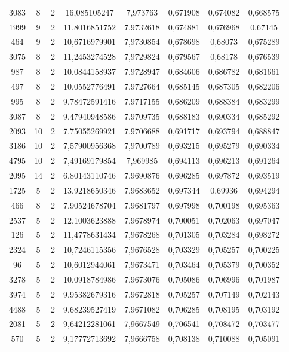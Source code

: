 \begin{longtable}{|c|c|c|c|c|c|c|c|}
3083 & 8 & 2 & 16,085105247 & 7,973763 & 0,671908 & 0,674082 & 0,668575 \\
1999 & 9 & 2 & 11,8016851752 & 7,9732618 & 0,674881 & 0,676968 & 0,67145 \\
464 & 9 & 2 & 10,6716979901 & 7,9730854 & 0,678698 & 0,68073 & 0,675289 \\
3075 & 8 & 2 & 11,2453274528 & 7,9729824 & 0,679567 & 0,68178 & 0,676539 \\
987 & 8 & 2 & 10,0844158937 & 7,9728947 & 0,684606 & 0,686782 & 0,681661 \\
497 & 8 & 2 & 10,0552776491 & 7,9727664 & 0,685145 & 0,687305 & 0,682206 \\
995 & 8 & 2 & 9,78472591416 & 7,9717155 & 0,686209 & 0,688384 & 0,683299 \\
3087 & 8 & 2 & 9,47940948586 & 7,9709735 & 0,688183 & 0,690334 & 0,685292 \\
2093 & 10 & 2 & 7,75055269921 & 7,9706688 & 0,691717 & 0,693794 & 0,688847 \\
3186 & 10 & 2 & 7,57900956368 & 7,9700789 & 0,693215 & 0,695279 & 0,690334 \\
4795 & 10 & 2 & 7,49169179854 & 7,969985 & 0,694113 & 0,696213 & 0,691264 \\
2095 & 14 & 2 & 6,80143110746 & 7,9690876 & 0,696285 & 0,697872 & 0,693519 \\
1725 & 5 & 2 & 13,9218650346 & 7,9683652 & 0,697344 & 0,69936 & 0,694294 \\
466 & 8 & 2 & 7,90524678704 & 7,9681797 & 0,697998 & 0,700198 & 0,695363 \\
2537 & 5 & 2 & 12,1003623888 & 7,9678974 & 0,700051 & 0,702063 & 0,697047 \\
126 & 5 & 2 & 11,4778631434 & 7,9678268 & 0,701305 & 0,703284 & 0,698272 \\
2324 & 5 & 2 & 10,7246115356 & 7,9676528 & 0,703329 & 0,705257 & 0,700225 \\
96 & 5 & 2 & 10,6012944061 & 7,9673471 & 0,703464 & 0,705379 & 0,700352 \\
3278 & 5 & 2 & 10,0918784986 & 7,9673076 & 0,705086 & 0,706996 & 0,701987 \\
3974 & 5 & 2 & 9,95382679316 & 7,9672818 & 0,705257 & 0,707149 & 0,702143 \\
4488 & 5 & 2 & 9,68239527419 & 7,9671082 & 0,706285 & 0,708195 & 0,703192 \\
2081 & 5 & 2 & 9,64212281061 & 7,9667549 & 0,706541 & 0,708472 & 0,703477 \\
570 & 5 & 2 & 9,17772713692 & 7,9666758 & 0,708138 & 0,710088 & 0,705091 \\

\end{longtable}
